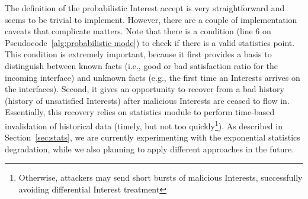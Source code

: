 The definition of the probabilistic Interest accept is very straightforward and seems to be trivial to implement.
However, there are a couple of implementation caveats that complicate matters.
Note that there is a condition (line 6 on Pseudocode~\ref{alg:probabilistic mode}) to check if there is a valid statistics point.
This condition is extremely important, because it first provides a basis to distinguish between known facts (i.e., good or bad satisfaction ratio for the incoming interface) and unknown facts (e.g., the first time an Interests arrives on the interfaces).
Second, it gives an opportunity to recover from a bad history (history of unsatisfied Interests) after malicious Interests are ceased to flow in.
Essentially, this recovery relies on statistics module to perform time-based invalidation of historical data (timely, but not too quickly\footnote{Otherwise, attackers may send short bursts of malicious Interests, successfully avoiding differential Interest treatment}).
As described in Section~\ref{sec:stats}, we are currently experimenting with the exponential statistics degradation, while we also planning to apply different approaches in the future.


